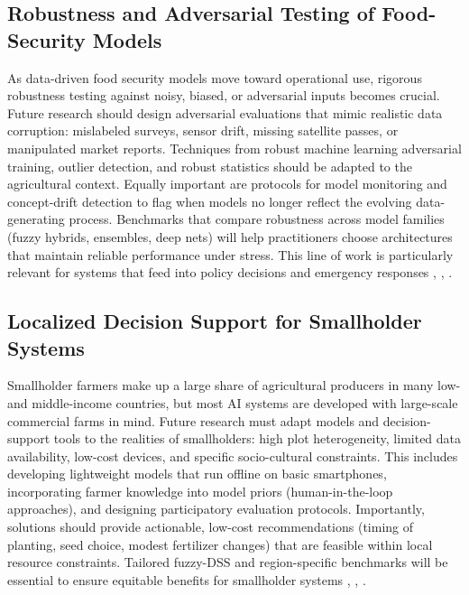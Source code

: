 \documentclass[preprint,12pt]{elsarticle}
\begin{document}
	\subsection{Robustness and Adversarial Testing of Food-Security Models}
	
	As data-driven food security models move toward operational use,
	rigorous robustness testing against noisy, biased, or adversarial inputs
	becomes crucial. Future research should design adversarial evaluations
	that mimic realistic data corruption: mislabeled surveys, sensor drift,
	missing satellite passes, or manipulated market reports. Techniques from
	robust machine learning adversarial training, outlier detection, and
	robust statistics should be adapted to the agricultural context. Equally
	important are protocols for model monitoring and concept-drift detection
	to flag when models no longer reflect the evolving data-generating
	process. Benchmarks that compare robustness across model families (fuzzy
	hybrids, ensembles, deep nets) will help practitioners choose
	architectures that maintain reliable performance under stress. This line
	of work is particularly relevant for systems that feed into policy
	decisions and emergency responses \cite{ref64}, \cite{ref68}, \cite{ref76}.
	
	\subsection{Localized Decision Support for Smallholder Systems}
	
	Smallholder farmers make up a large share of agricultural producers in
	many low- and middle-income countries, but most AI systems are developed
	with large-scale commercial farms in mind. Future research must adapt
	models and decision-support tools to the realities of smallholders: high
	plot heterogeneity, limited data availability, low-cost devices, and
	specific socio-cultural constraints. This includes developing
	lightweight models that run offline on basic smartphones, incorporating
	farmer knowledge into model priors (human-in-the-loop approaches), and
	designing participatory evaluation protocols. Importantly, solutions
	should provide actionable, low-cost recommendations (timing of planting,
	seed choice, modest fertilizer changes) that are feasible within local
	resource constraints. Tailored fuzzy-DSS and region-specific benchmarks
	will be essential to ensure equitable benefits for smallholder systems
	\cite{ref72}, \cite{ref77}, \cite{ref73}.
	
\end{document}
